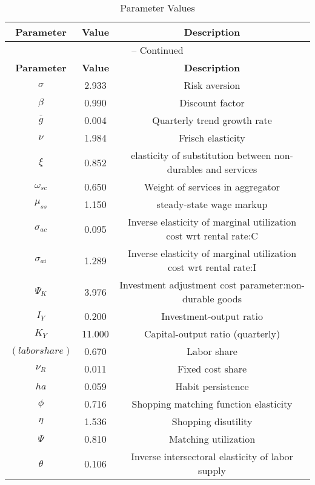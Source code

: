 \begin{center}
\begin{longtable}{ccc}
\caption{Parameter Values}\\%
\toprule%
\multicolumn{1}{c}{\textbf{Parameter}} &
\multicolumn{1}{c}{\textbf{Value}} &
 \multicolumn{1}{c}{\textbf{Description}}\\%
\midrule%
\endfirsthead
\multicolumn{3}{c}{{\tablename} \thetable{} -- Continued}\\%
\midrule%
\multicolumn{1}{c}{\textbf{Parameter}} &
\multicolumn{1}{c}{\textbf{Value}} &
  \multicolumn{1}{c}{\textbf{Description}}\\%
\midrule%
\endhead
${\sigma}$ 	 & 	 2.933 	 & 	 Risk aversion\\
${\beta}$ 	 & 	 0.990 	 & 	 Discount factor\\
${\overline{g}}$ 	 & 	 0.004 	 & 	 Quarterly trend growth rate\\
$\nu$ 	 & 	 1.984 	 & 	 Frisch elasticity\\
$\xi$ 	 & 	 0.852 	 & 	 elasticity of substitution between non-durables and services\\
$\omega_{sc}$ 	 & 	 0.650 	 & 	 Weight of services in aggregator\\
$\mu_{ss}$ 	 & 	 1.150 	 & 	 steady-state wage markup\\
${\sigma_{ac}}$ 	 & 	 0.095 	 & 	 Inverse elasticity of marginal utilization cost wrt rental rate:C\\
${\sigma_{ai}}$ 	 & 	 1.289 	 & 	 Inverse elasticity of marginal utilization cost wrt rental rate:I\\
${\Psi_{K}}$ 	 & 	 3.976 	 & 	 Investment adjustment cost parameter:non-durable goods\\
${I_Y}$ 	 & 	 0.200 	 & 	 Investment-output ratio\\
${K_Y}$ 	 & 	 11.000 	 & 	 Capital-output ratio (quarterly)\\
$(labor share)$ 	 & 	 0.670 	 & 	 Labor share\\
${\nu_R}$ 	 & 	 0.011 	 & 	 Fixed cost share\\
${ha}$ 	 & 	 0.059 	 & 	 Habit persistence\\
${\phi}$ 	 & 	 0.716 	 & 	 Shopping matching function elasticity\\
${\eta}$ 	 & 	 1.536 	 & 	 Shopping disutility\\
${\Psi}$ 	 & 	 0.810 	 & 	 Matching utilization\\
${\theta}$ 	 & 	 0.106 	 & 	 Inverse intersectoral elasticity of labor supply\\

\end{longtable}
\end{center}
